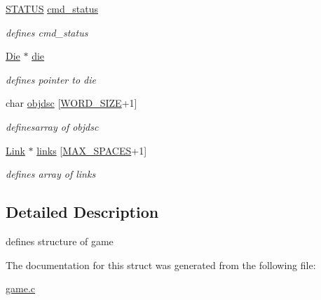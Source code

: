 \begin{DoxyCompactItemize}
\hyperlink{types_8h_a32c27cc471df37f4fc818d65de0a56c4}{S\+T\+A\+T\+US} \hyperlink{struct__Game_aea7cfcbda905e1b3ce6f9b3542b7d6cc}{cmd\+\_\+status}
\begin{DoxyCompactList}\small\item\em defines cmd\+\_\+status \end{DoxyCompactList}\item 
\mbox{\label{struct__Game_a0d6009b5dcb080489c192a9198fa7d46}} 
\hyperlink{die_8h_a892f0b0bf81d69a1f7a14ea238e36dd3}{Die} $\ast$ \hyperlink{struct__Game_a0d6009b5dcb080489c192a9198fa7d46}{die}
\begin{DoxyCompactList}\small\item\em defines pointer to die \end{DoxyCompactList}\item 
\mbox{\label{struct__Game_ad0fa85f42aa7e8a7d560312c80988776}} 
char \hyperlink{struct__Game_ad0fa85f42aa7e8a7d560312c80988776}{objdsc} \mbox{[}\hyperlink{types_8h_a92ed8507d1cd2331ad09275c5c4c1c89}{W\+O\+R\+D\+\_\+\+S\+I\+ZE}+1\mbox{]}
\begin{DoxyCompactList}\small\item\em definesarray of objdsc \end{DoxyCompactList}\item 
\mbox{\label{struct__Game_ac2e1dc07e9d2ad410d1c16bc83ba5101}} 
\hyperlink{link_8h_ae3b299941e67be6971bfd64a25505eff}{Link} $\ast$ \hyperlink{struct__Game_ac2e1dc07e9d2ad410d1c16bc83ba5101}{links} \mbox{[}\hyperlink{space_8h_a5f54fd55f983a2e33ce076cd9f587e82}{M\+A\+X\+\_\+\+S\+P\+A\+C\+ES}+1\mbox{]}
\begin{DoxyCompactList}\small\item\em defines array of links \end{DoxyCompactList}\end{DoxyCompactItemize}


\subsection{Detailed Description}
defines structure of game 

The documentation for this struct was generated from the following file\+:\begin{DoxyCompactItemize}
\item 
\hyperlink{game_8c}{game.\+c}\end{DoxyCompactItemize}

